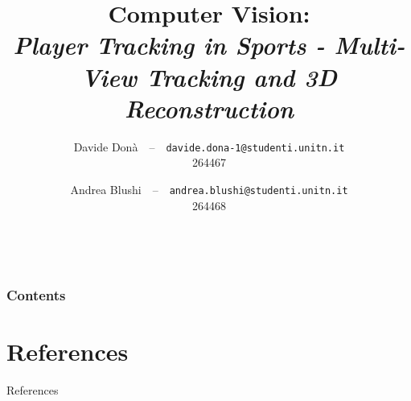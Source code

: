 \documentclass[10pt]{beamer}
\begin{document}
\title[Player Tracking in Sports]{Computer Vision:\\ \normalsize\textit{Player Tracking in Sports - Multi-View Tracking and 3D Reconstruction}
}
\author[University of Trento]{%
  Davide Donà\ \ --\ \ \small\texttt{davide.dona-1@studenti.unitn.it}\\
  \small 264467\\
  \and
  Andrea Blushi\ \ --\ \ \small\texttt{andrea.blushi@studenti.unitn.it}\\
  \small 264468
}


\date[]{\MonthName\ \number\year}

\frame{\titlepage}
\begin{frame}
\frametitle{Contents}
\tableofcontents
\end{frame}







\section*{References}
\begin{frame}[allowframebreaks]{References}
\footnotesize


\end{frame}

\appendix

\end{document}
